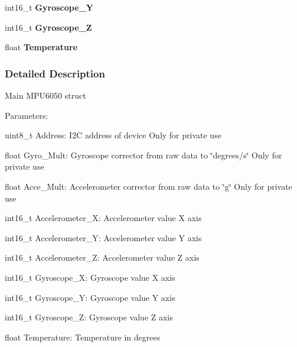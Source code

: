 \begin{DoxyCompactItemize}
\item 
\hypertarget{struct_t_m___m_p_u6050__t_ab9d5f3a9d5a695f2d11758499ca9b866}{}int16\+\_\+t {\bfseries Gyroscope\+\_\+\+Y}\label{struct_t_m___m_p_u6050__t_ab9d5f3a9d5a695f2d11758499ca9b866}

\item 
\hypertarget{struct_t_m___m_p_u6050__t_ae450c4083102bf36d05fce2b00832398}{}int16\+\_\+t {\bfseries Gyroscope\+\_\+\+Z}\label{struct_t_m___m_p_u6050__t_ae450c4083102bf36d05fce2b00832398}

\item 
\hypertarget{struct_t_m___m_p_u6050__t_afa66fac91ab948980be979b768e67c5a}{}float {\bfseries Temperature}\label{struct_t_m___m_p_u6050__t_afa66fac91ab948980be979b768e67c5a}

\end{DoxyCompactItemize}


\subsubsection{Detailed Description}
Main M\+P\+U6050 struct

Parameters\+:
\begin{DoxyItemize}
\item uint8\+\_\+t Address\+: I2\+C address of device Only for private use
\item float Gyro\+\_\+\+Mult\+: Gyroscope corrector from raw data to \char`\"{}degrees/s\char`\"{} Only for private use
\item float Acce\+\_\+\+Mult\+: Accelerometer corrector from raw data to \char`\"{}g\char`\"{} Only for private use
\item int16\+\_\+t Accelerometer\+\_\+\+X\+: Accelerometer value X axis
\item int16\+\_\+t Accelerometer\+\_\+\+Y\+: Accelerometer value Y axis
\item int16\+\_\+t Accelerometer\+\_\+\+Z\+: Accelerometer value Z axis
\item int16\+\_\+t Gyroscope\+\_\+\+X\+: Gyroscope value X axis
\item int16\+\_\+t Gyroscope\+\_\+\+Y\+: Gyroscope value Y axis
\item int16\+\_\+t Gyroscope\+\_\+\+Z\+: Gyroscope value Z axis
\item float Temperature\+: Temperature in degrees 
\end{DoxyItemize}